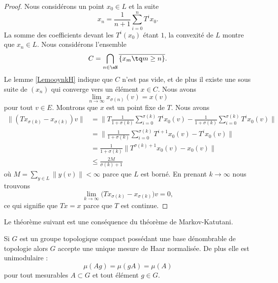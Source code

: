 \begin{proof}
    Nous considérons un point \( x_0\in L\) et la suite
    \begin{equation}
        x_n=\frac{1}{ n+1 }\sum_{i=0}^n T^ix_0.
    \end{equation}
    La somme des coefficients devant les \( T^i(x_0)\) étant \( 1\), la convexité de \( L\) montre que \( x_n\in L\). Nous considérons l'ensemble
    \begin{equation}
        C=\bigcap_{n\in \eN}\overline{ \{ x_m\tq m\geq n \} }.
    \end{equation}
    Le lemme \ref{LemooynkH} indique que \( C\) n'est pas vide, et de plus il existe une sous suite de \( (x_n)\) qui converge vers un élément \( x\in C\). Nous avons
    \begin{equation}
        \lim_{n\to \infty} x_{\sigma(n)}(v)=x(v)
    \end{equation}
    pour tout \( v\in E\). Montrons que \( x\) est un point fixe de \( T\). Nous avons
    \begin{subequations}
        \begin{align}
            \| (Tx_{\sigma(k)}-x_{\sigma(k)})v \|&=\Big\| T\frac{1}{ 1+\sigma(k) }\sum_{i=0}^{\sigma(k)}T^ix_0(v)-\frac{1}{ 1+\sigma(k) }\sum_{i=0}^{\sigma(k)}T^ix_0(v) \Big\|\\
            &=\Big\| \frac{1}{ 1+\sigma(k) }\sum_{i=0}^{\sigma(k)}T^{i+1}x_0(v)-T^ix_0(v) \Big\|\\
            &=\frac{1}{ 1+\sigma(k) }\big\| T^{\sigma(k)+1}x_0(v)-x_0(v) \big\|\\
            &\leq\frac{ 2M }{ \sigma(k)+1 }
        \end{align}
    \end{subequations}
    où \( M=\sum_{y\in L}\| y(v) \|<\infty\) parce que \( L\) est borné. En prenant \( k\to\infty\) nous trouvons
    \begin{equation}
        \lim_{k\to \infty} \big( Tx_{\sigma(k)}-x_{\sigma(k)} \big)v=0,
    \end{equation}
    ce qui signifie que \( Tx=x\) parce que \( T\) est continue.
\end{proof}

Le théorème suivant est une conséquence du théorème de Markov-Katutani.
\begin{theorem} \label{ThoBZBooOTxqcI}
    Si \( G\) est un groupe topologique compact possédant une base dénombrable de topologie alors \( G\) accepte une unique mesure de Haar normalisée. De plus elle est unimodulaire :
    \begin{equation}
        \mu(Ag)=\mu(gA)=\mu(A)
    \end{equation}
    pour tout mesurables \( A\subset G\) et tout élément \( g\in G\).
\end{theorem}


